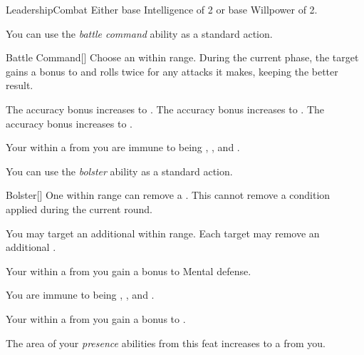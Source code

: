     \begin{feat}{Leadership}{Combat}
        \featpre Either base Intelligence of 2 or base Willpower of 2.

         You can use the \textit{battle command} ability as a standard action.
        \begin{freeability}{Battle Command}[]
            Choose an  within \rngmed range.
            During the current phase, the target gains a  bonus to  and rolls twice for any attacks it makes, keeping the better result.

            \rankline
             The accuracy bonus increases to .
             The accuracy bonus increases to .
             The accuracy bonus increases to .
        \end{freeability}

         Your  within a \arealarge {} from you are immune to being \shaken, \frightened, and \panicked.

         You can use the \textit{bolster} ability as a standard action.
        \begin{freeability}{Bolster}[]
            One  within \rngmed range can remove a .
            This cannot remove a condition applied during the current round.

            \rankline
             You may target an additional  within range.
             Each target may remove an additional .
        \end{freeability}

         Your  within a \arealarge {} from you gain a  bonus to Mental defense.

         You are immune to being \shaken, \frightened, and \panicked.

         Your  within a \arealarge {} from you gain a  bonus to .

         The area of your \textit{presence} abilities from this feat increases to a \areahuge {} from you.
    \end{feat}

